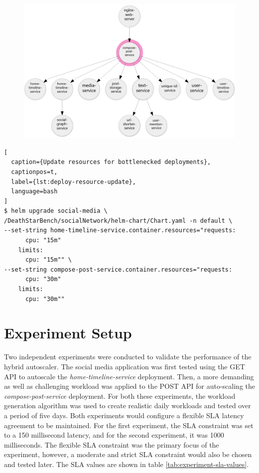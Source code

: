 \begin{figure}[htb]
\begin{minipage}{0.75\linewidth}
        \includegraphics[width=1.0\linewidth]{Figures/Compose-Post-POST-Trace.png}
    \end{minipage}
\end{figure}

\begin{lstlisting}[
  caption={Update resources for bottlenecked deployments},
  captionpos=t,
  label={lst:deploy-resource-update},
  language=bash
]
$ helm upgrade social-media \
/DeathStarBench/socialNetwork/helm-chart/Chart.yaml -n default \
--set-string home-timeline-service.container.resources="requests: 
      cpu: "15m"
    limits:
      cpu: "15m"" \
--set-string compose-post-service.container.resources="requests: 
      cpu: "30m"
    limits:
      cpu: "30m""
\end{lstlisting}

\section{Experiment Setup}
\label{sec:ch5-exp-setup}

Two independent experiments were conducted to validate the performance of the hybrid autoscaler. The social media application was first tested using the GET API to autoscale the \textit{home-timeline-service} deployment. Then, a more demanding as well as challenging workload was applied to the POST API for auto-scaling the \textit{compose-post-service} deployment. For both these experiments, the workload generation algorithm was used to create realistic daily workloads and tested over a period of five days. Both experiments would configure a flexible SLA latency agreement to be maintained. For the first experiment, the SLA constraint was set to a 150 millisecond latency, and for the second experiment, it was 1000 milliseconds. The flexible SLA constraint was the primary focus of the experiment, however, a moderate and strict SLA constraint would also be chosen and tested later. The SLA values are shown in table \ref{tab:experiment-sla-values}.\par

